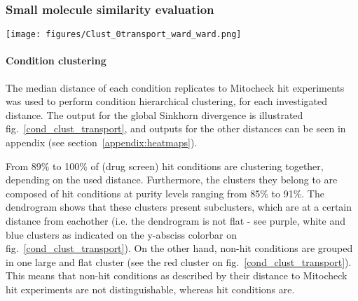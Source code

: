 \subsubsection{Small molecule similarity evaluation}

\begin{figure*}[ht!]
\centerline{\texttt{[image: figures/Clust\_0transport\_ward\_ward.png]}}

\caption{Drug screen condition - Mitocheck siRNA two-dimensional hierarchical clustering using global Sinkhorn divergence. Ward method was used in combination with the Euclidean distance.}
\label{cond_clust_transport}
\end{figure*}

\paragraph{Condition clustering}
The median distance of each condition replicates to Mitocheck hit
experiments was used to perform condition hierarchical clustering, for
each investigated distance. The output for the global Sinkhorn
divergence is illustrated fig.~\ref{cond_clust_transport}, and outputs
for the other distances can be seen in appendix (see
section~\ref{appendix:heatmaps}). 

From 89\% to 100\% of (drug screen) hit conditions are clustering
together, depending on the used distance. Furthermore, the clusters
they belong to are composed of hit conditions at purity levels ranging
from 85\% to 91\%. The dendrogram shows that these clusters present
subclusters, which are at a certain distance from eachother (i.e. the
dendrogram is not flat - see purple, white and blue clusters as
indicated on the y-absciss colorbar on
fig.~\ref{cond_clust_transport}). On the other hand, non-hit
conditions are grouped in one large and flat cluster (see the red
cluster on fig.~\ref{cond_clust_transport}). This means that non-hit
conditions as described by their distance to Mitocheck hit experiments
are not distinguishable, whereas hit conditions are. 


